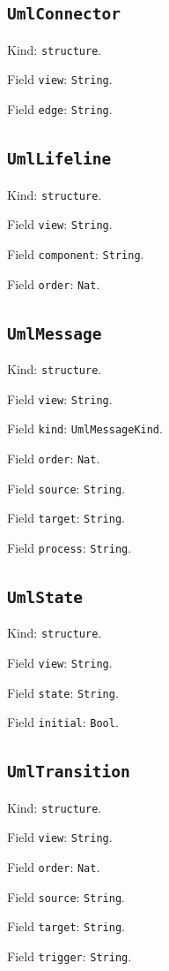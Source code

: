 \documentclass[11pt]{article}
\begin{document}
\subsection*{\texttt{UmlConnector}}
\noindent Kind: \texttt{structure}.\par
\noindent Field \texttt{view}: \texttt{String}.\par
\noindent Field \texttt{edge}: \texttt{String}.\par
\subsection*{\texttt{UmlLifeline}}
\noindent Kind: \texttt{structure}.\par
\noindent Field \texttt{view}: \texttt{String}.\par
\noindent Field \texttt{component}: \texttt{String}.\par
\noindent Field \texttt{order}: \texttt{Nat}.\par
\subsection*{\texttt{UmlMessage}}
\noindent Kind: \texttt{structure}.\par
\noindent Field \texttt{view}: \texttt{String}.\par
\noindent Field \texttt{kind}: \texttt{UmlMessageKind}.\par
\noindent Field \texttt{order}: \texttt{Nat}.\par
\noindent Field \texttt{source}: \texttt{String}.\par
\noindent Field \texttt{target}: \texttt{String}.\par
\noindent Field \texttt{process}: \texttt{String}.\par
\subsection*{\texttt{UmlState}}
\noindent Kind: \texttt{structure}.\par
\noindent Field \texttt{view}: \texttt{String}.\par
\noindent Field \texttt{state}: \texttt{String}.\par
\noindent Field \texttt{initial}: \texttt{Bool}.\par
\subsection*{\texttt{UmlTransition}}
\noindent Kind: \texttt{structure}.\par
\noindent Field \texttt{view}: \texttt{String}.\par
\noindent Field \texttt{order}: \texttt{Nat}.\par
\noindent Field \texttt{source}: \texttt{String}.\par
\noindent Field \texttt{target}: \texttt{String}.\par
\noindent Field \texttt{trigger}: \texttt{String}.\par
\end{document}
